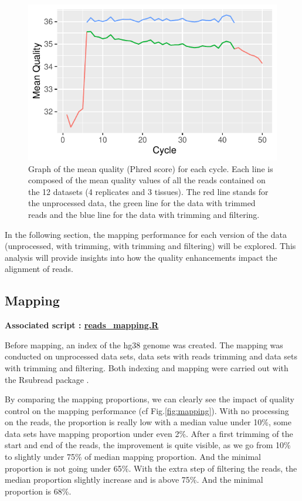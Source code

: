 \documentclass[a4paper, 11pt]{article}
\begin{document}
\begin{multicols}{2}
\begin{figure}[H]
    \centering
    \includegraphics[width=1\columnwidth]{Figures/QC_plots/mean_per_group_and_cycles.pdf}
    \caption{\footnotesize{ Graph of the mean quality (Phred score) for each cycle. Each line is composed of the mean quality values of all the reads contained on the 12 datasets (4 replicates and 3 tissues). The red line stands for the unprocessed data, the green line for the data with trimmed reads and the blue line for the data with trimming and filtering.}}
    \label{fig:cycles_mean}
\end{figure}

In the following section, the mapping performance for each version of the data (unprocessed, with trimming, with trimming and filtering) will be explored. This analysis will provide insights into how the quality enhancements impact the alignment of reads.

\subsection{Mapping}
\begin{scriptsize}
	\textbf{Associated script : \href{https://github.com/leopoldguyot/BINF-402_Transcriptomic_Project/blob/main/reads_mapping.R}{reads\_mapping.R}} 
\end{scriptsize}


Before mapping, an index of the hg38 genome was created. The mapping was conducted on unprocessed data sets, data sets with reads trimming and data sets with trimming and filtering. Both indexing and mapping were carried out with the Rsubread package \citep{Rsubread}.

By comparing the mapping proportions, we can clearly see the impact of quality control on the mapping performance (cf Fig.\ref{fig:mapping}). With no processing on the reads, the proportion is really low with a median value under 10\%, some data sets have mapping proportion under even 2\%. After a first trimming of the start and end of the reads, the improvement is quite visible, as we go from 10\% to slightly under 75\% of median mapping proportion. And the minimal proportion is not going under 65\%. With the extra step of filtering the reads, the median proportion slightly increase and is above 75\%. And the minimal proportion is 68\%. 



\end{multicols}
\end{document}
